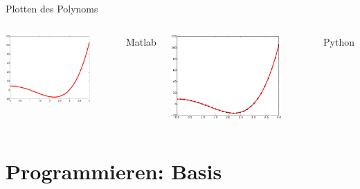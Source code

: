 \documentclass[hyperref={xetex}]{beamer}
\begin{document}
\begin{frame}[fragile]{Plotten des Polynoms}
\begin{center}
\begin{columns}[c]
\includegraphics[width=0.8\textwidth]{figures/polynom_ma} 

\centerline{Matlab}
\includegraphics[width=0.8\textwidth]{figures/polynom_py} 

\centerline{Python}
\end{columns}
\end{center}

\end{frame}

\section{Programmieren: Basis}
\end{document}
